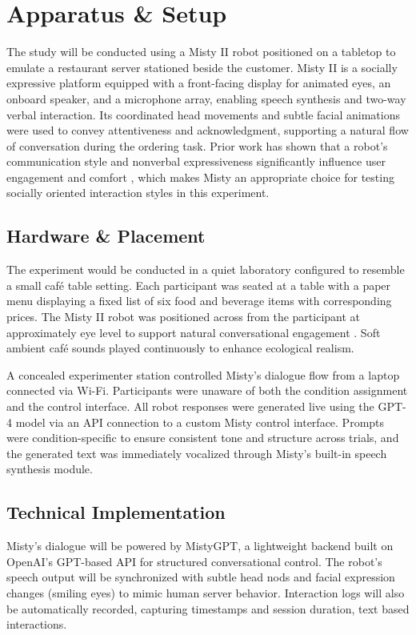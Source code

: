 \documentclass[conference]{IEEEtran}
\begin{document}
\section{Apparatus \& Setup}
\label{sec:apparatus_setup}
The study will be conducted using a Misty II robot positioned on a tabletop to emulate a restaurant server stationed beside the customer. Misty II is a socially expressive platform equipped with a front-facing display for animated eyes, an onboard speaker, and a microphone array, enabling speech synthesis and two-way verbal interaction. Its coordinated head movements and subtle facial animations were used to convey attentiveness and acknowledgment, supporting a natural flow of conversation during the ordering task. Prior work has shown that a robot's communication style and nonverbal expressiveness significantly influence user engagement and comfort \cite{b24}, which makes Misty an appropriate choice for testing socially oriented interaction styles in this experiment.

\subsection{Hardware \& Placement}
The experiment would be conducted in a quiet laboratory configured to resemble a small café table setting. Each participant was seated at a table with a paper menu displaying a fixed list of six food and beverage items with corresponding prices. The Misty II robot was positioned across from the participant at approximately eye level to support natural conversational engagement \cite{b25, b26}. Soft ambient café sounds played continuously to enhance ecological realism.

A concealed experimenter station controlled Misty's dialogue flow from a laptop connected via Wi-Fi. Participants were unaware of both the condition assignment and the control interface. All robot responses were generated live using the GPT-4 model via an API connection to a custom Misty control interface. Prompts were condition-specific to ensure consistent tone and structure across trials, and the generated text was immediately vocalized through Misty's built-in speech synthesis module.

\subsection{Technical Implementation}
Misty's dialogue will be powered by MistyGPT, a lightweight backend built on OpenAI's GPT-based API for structured conversational control. The robot's speech output will be synchronized with subtle head nods and facial expression changes (smiling eyes) to mimic human server behavior. Interaction logs will also be automatically recorded, capturing timestamps and session duration, text based interactions.
\end{document}

